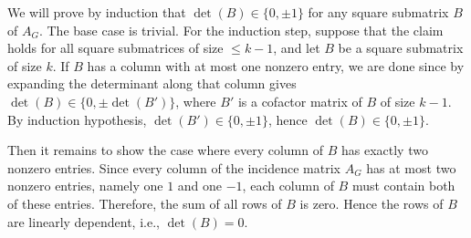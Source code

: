 \documentclass[11pt]{article}
\renewcommand{\leq}{\leqslant}
\begin{document}
\begin{enumerate}[1)]
\begin{solution}
We will prove by induction that $\det(B) \in \{0,\pm 1\}$ for any square submatrix $B$ of $A_G$. The base case is trivial. For the induction step, suppose that the claim holds for all square submatrices of size $\leq k-1$, and let $B$ be a square submatrix of size $k$.
If $B$ has a column with at most one nonzero entry, we are done since by expanding the determinant along that column gives $\det(B) \in \{0,\pm \det(B')\}$,
where $B'$ is a cofactor matrix of $B$ of size $k-1$. By induction hypothesis,
$\det(B') \in \{0,\pm 1\}$, hence $\det(B)\in \{0,\pm 1\}$.

Then it remains to show the case where every column of $B$ has exactly two nonzero entries. Since every column of the incidence matrix $A_G$ has at most
two nonzero entries, namely one $1$ and one $-1$, each column of $B$ must
contain both of these entries. Therefore, the sum of all rows of $B$ is zero. Hence the rows of $B$ are linearly dependent, i.e., $\det(B)=0$.
\end{solution}
\end{enumerate}


  
\end{document}
